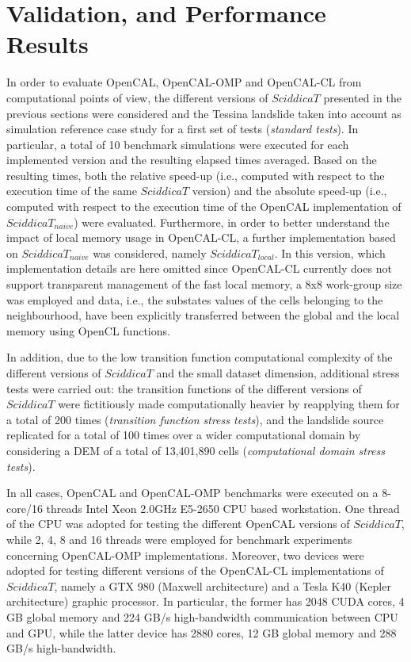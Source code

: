 \section{Validation, and Performance Results}
\label{sec:computational-results}

In order to evaluate OpenCAL, OpenCAL-OMP and OpenCAL-CL from
computational points of view, the different versions of $SciddicaT$
presented in the previous sections were considered and the Tessina
landslide taken into account as simulation reference case study for
a first set of tests (\emph{standard tests}). In particular, a total
of 10 benchmark simulations were executed for each implemented
version and the resulting elapsed times averaged. Based on the
resulting times, both the relative speed-up (i.e., computed with
respect to the execution time of the same $SciddicaT$ version) and
the absolute speed-up (i.e., computed with respect to the execution
time of the OpenCAL implementation of $SciddicaT_{naive}$) were
evaluated. Furthermore, in order to better understand the impact of
local memory usage in OpenCAL-CL, a further implementation based on
$SciddicaT_{naive}$ was considered, namely $SciddicaT_{local}$. In
this version, which implementation details are here omitted since
OpenCAL-CL currently does not support transparent management of the
fast local memory, a 8x8 work-group size was employed and data,
i.e., the substates values of the cells belonging to the
neighbourhood, have been explicitly transferred between the global
and the local memory using OpenCL functions.

In addition, due to the low transition function computational
complexity of the different versions of $SciddicaT$ and the small
dataset dimension, additional stress tests were carried out: the
transition functions of the different versions of $SciddicaT$ were
fictitiously made computationally heavier by reapplying them for a
total of 200 times (\emph{transition function stress tests}), and
the landslide source replicated for a total of 100 times over a
wider computational domain by considering a DEM of a total of
13,401,890 cells (\emph{computational domain stress tests}).

In all cases, OpenCAL and OpenCAL-OMP benchmarks were executed on a
8-core/16 threads Intel Xeon 2.0GHz E5-2650 CPU based
workstation. One thread of the CPU was adopted for testing the
different OpenCAL versions of $SciddicaT$, while 2, 4, 8 and 16
threads were employed for benchmark experiments concerning
OpenCAL-OMP implementations. Moreover, two devices were adopted for
testing different versions of the OpenCAL-CL implementations of
$SciddicaT$, namely a GTX 980 (Maxwell architecture) and a Tesla K40
(Kepler architecture) graphic processor. In particular, the former
has 2048 CUDA cores, 4 GB global memory and 224 GB/s high-bandwidth
communication between CPU and GPU, while the latter device has 2880
cores, 12 GB global memory and 288 GB/s high-bandwidth.

